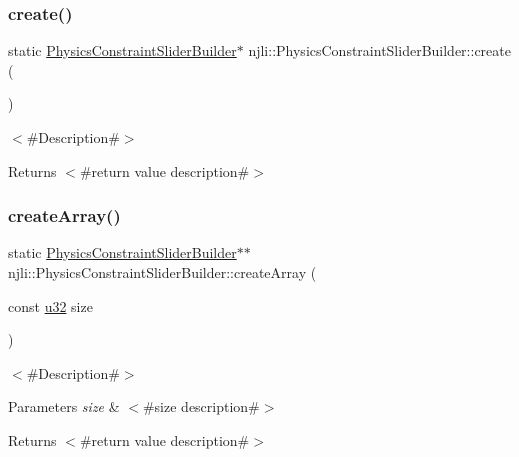 \subsubsection{\texorpdfstring{create()}{create()}}
{\footnotesize\ttfamily static \mbox{\hyperlink{classnjli_1_1_physics_constraint_slider_builder}{Physics\+Constraint\+Slider\+Builder}}$\ast$ njli\+::\+Physics\+Constraint\+Slider\+Builder\+::create (\begin{DoxyParamCaption}{ }\end{DoxyParamCaption})\hspace{0.3cm}{\ttfamily [static]}}

$<$\#\+Description\#$>$

\begin{DoxyReturn}{Returns}
$<$\#return value description\#$>$ 
\end{DoxyReturn}
\mbox{\label{classnjli_1_1_physics_constraint_slider_builder_a0eea07fc0548741da6cdee5d9e293b42}} 
\subsubsection{\texorpdfstring{create\+Array()}{createArray()}}
{\footnotesize\ttfamily static \mbox{\hyperlink{classnjli_1_1_physics_constraint_slider_builder}{Physics\+Constraint\+Slider\+Builder}}$\ast$$\ast$ njli\+::\+Physics\+Constraint\+Slider\+Builder\+::create\+Array (\begin{DoxyParamCaption}\item[{const \mbox{\hyperlink{_util_8h_a10e94b422ef0c20dcdec20d31a1f5049}{u32}}}]{size }\end{DoxyParamCaption})\hspace{0.3cm}{\ttfamily [static]}}

$<$\#\+Description\#$>$


\begin{DoxyParams}{Parameters}
{\em size} & $<$\#size description\#$>$\\
\hline
\end{DoxyParams}
\begin{DoxyReturn}{Returns}
$<$\#return value description\#$>$ 
\end{DoxyReturn}
\mbox{\label{classnjli_1_1_physics_constraint_slider_builder_af5f8d51f95ad9d7e0c503e748f76be63}} 
